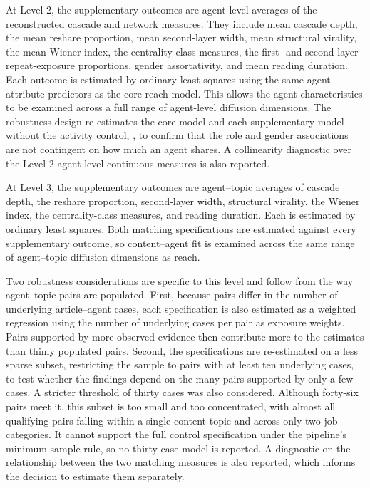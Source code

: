 At Level 2, the supplementary outcomes are agent-level averages of the reconstructed cascade and network measures. They include mean cascade depth, the mean reshare proportion, mean second-layer width, mean structural virality, the mean Wiener index, the centrality-class measures, the first- and second-layer repeat-exposure proportions, gender assortativity, and mean reading duration. Each outcome is estimated by ordinary least squares using the same agent-attribute predictors as the core reach model. This allows the agent characteristics to be examined across a full range of agent-level diffusion dimensions. The robustness design re-estimates the core model and each supplementary model without the activity control, , to confirm that the role and gender associations are not contingent on how much an agent shares. A collinearity diagnostic over the Level 2 agent-level continuous measures is also reported.

At Level 3, the supplementary outcomes are agent–topic averages of cascade depth, the reshare proportion, second-layer width, structural virality, the Wiener index, the centrality-class measures, and reading duration. Each is estimated by ordinary least squares. Both matching specifications are estimated against every supplementary outcome, so content–agent fit is examined across the same range of agent–topic diffusion dimensions as reach.

Two robustness considerations are specific to this level and follow from the way agent–topic pairs are populated. First, because pairs differ in the number of underlying article–agent cases, each specification is also estimated as a weighted regression using the number of underlying cases per pair as exposure weights. Pairs supported by more observed evidence then contribute more to the estimates than thinly populated pairs. Second, the specifications are re-estimated on a less sparse subset, restricting the sample to pairs with at least ten underlying cases, to test whether the findings depend on the many pairs supported by only a few cases. A stricter threshold of thirty cases was also considered. Although forty-six pairs meet it, this subset is too small and too concentrated, with almost all qualifying pairs falling within a single content topic and across only two job categories. It cannot support the full control specification under the pipeline's minimum-sample rule, so no thirty-case model is reported. A diagnostic on the relationship between the two matching measures is also reported, which informs the decision to estimate them separately.

